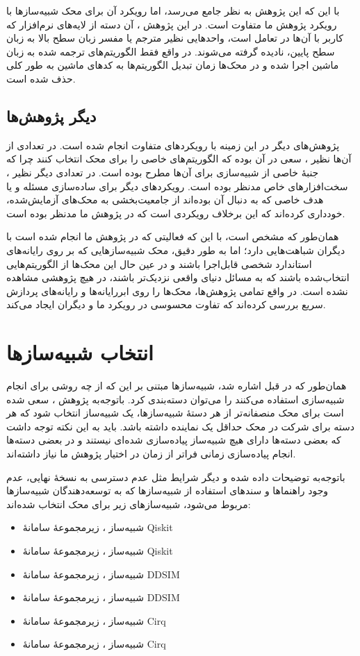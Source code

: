 با این که این پژوهش
\cite{li_qasmbench_2022}
به نظر جامع می‌رسد، اما رویکرد آن برای محک شبیه‌سازها با رویکرد پژوهش ما متفاوت است. در این پژوهش
\cite{li_qasmbench_2022}،
آن دسته از لایه‌های نرم‌افزار که کاربر با آن‌ها در تعامل است، واحدهایی نظیر مترجم یا مفسر زبان سطح بالا به زبان سطح پایین، نادیده گرفته می‌شوند. در واقع فقط الگوریتم‌های ترجمه شده به زبان ماشین اجرا شده و در محک‌ها زمان تبدیل الگوریتم‌ها به کدهای ماشین به طور کلی حذف شده است.

\subsection{دیگر پژوهش‌ها}
پژوهش‌های دیگر در این زمینه با رویکردهای متفاوت انجام شده است. در تعدادی از آن‌ها نظیر \cite{li_quapprox_2024}، سعی در آن بوده که الگوریتم‌های خاصی را برای محک انتخاب کنند چرا که جنبهٔ خاصی از شبیه‌سازی برای آن‌ها مطرح بوده است. در تعدادی دیگر نظیر \cite{miessen_benchmarking_2024, barbaresco_bacq_2024}، سخت‌افزارهای خاص مدنظر بوده است. رویکردهای دیگر برای ساده‌سازی مسئله و یا هدف خاصی که به دنبال آن بوده‌اند از جامعیت‌بخشی به محک‌های آزمایش‌شده، خودداری کرده‌اند که این برخلاف رویکردی است که در پژوهش ما مدنظر بوده است.

همان‌طور که مشخص است، با این که فعالیتی که در پژوهش ما انجام شده است با دیگران شباهت‌هایی دارد؛ اما به طور دقیق، محک شبیه‌سازهایی که بر روی رایانه‌های استاندارد شخصی قابل‌اجرا باشند و در عین حال این محک‌ها از الگوریتم‌هایی انتخاب‌شده باشند که به مسائل دنیای واقعی نزدیک‌تر باشند، در هیچ پژوهشی مشاهده نشده است. در واقع تمامی پژوهش‌ها، محک‌ها را روی ابررایانه‌ها و رایانه‌های پردازش سریع بررسی کرده‌اند که تفاوت محسوسی در رویکرد‌ ما و دیگران ایجاد می‌کند.


\section{انتخاب شبیه‌سازها}
همان‌طور که در قبل اشاره شد، شبیه‌سازها مبتنی بر این که از چه روشی برای انجام شبیه‌سازی استفاده می‌کنند را می‌توان دسته‌بندی کرد. باتوجه‌به پژوهش \cite{young_simulating_2023}، سعی شده است برای محک منصفانه‌تر از هر دستهٔ شبیه‌سازها، یک شبیه‌ساز انتخاب شود که هر دسته برای شرکت در محک حداقل یک نماینده داشته باشد. باید به این نکته توجه داشت که بعضی دسته‌ها دارای هیچ شبیه‌ساز پیاده‌سازی شده‌ای نیستند و در بعضی دسته‌ها انجام پیاده‌سازی زمانی فراتر از زمان در اختیار  پژوهش ما نیاز داشته‌اند.

باتوجه‌به توضیحات داده شده و دیگر شرایط مثل عدم دسترسی به نسخهٔ نهایی، عدم وجود راهنماها و سندهای استفاده از شبیه‌سازها که به توسعه‌دهندگان شبیه‌سازها مربوط می‌شود، شبیه‌سازهای زیر برای محک انتخاب شده‌اند:
\begin{itemize}
	\itemsep -1em 
	\item شبیه‌ساز ، زیرمجموعهٔ سامانهٔ Qiskit
	\item شبیه‌ساز ، زیرمجموعهٔ سامانهٔ Qiskit
	\item شبیه‌ساز ، زیرمجموعهٔ سامانهٔ DDSIM
	\item شبیه‌ساز ، زیرمجموعهٔ سامانهٔ DDSIM
	\item شبیه‌ساز ، زیرمجموعهٔ سامانهٔ Cirq
	\item شبیه‌ساز ، زیرمجموعهٔ سامانهٔ Cirq
\end{itemize}

